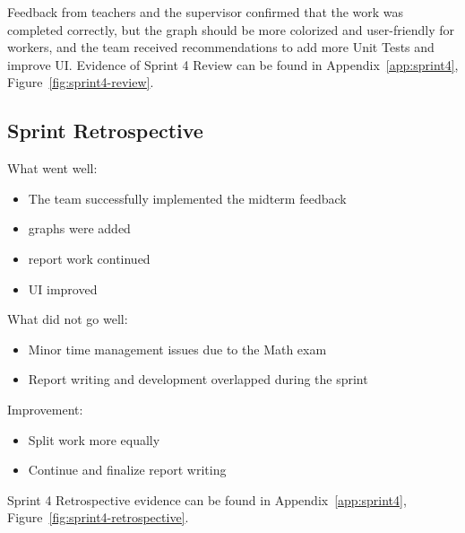 Feedback from teachers and the supervisor confirmed that the work was completed correctly, but the graph should be more colorized and user-friendly for workers, and the team received recommendations to add more Unit Tests and improve UI. Evidence of Sprint 4 Review can be found in Appendix~\ref{app:sprint4}, Figure~\ref{fig:sprint4-review}.

 

\subsection*{Sprint Retrospective}

What went well:

\begin{itemize}

    \item The team successfully implemented the midterm feedback

    \item graphs were added

    \item report work continued

    \item UI improved

\end{itemize}



What did not go well:

\begin{itemize}

    \item  Minor time management issues due to the Math exam

    \item  Report writing and development overlapped during the sprint

\end{itemize}



Improvement:

\begin{itemize}

    \item Split work more equally

    \item Continue and finalize report writing

\end{itemize}

Sprint 4 Retrospective evidence can be found in Appendix~\ref{app:sprint4}, Figure~\ref{fig:sprint4-retrospective}.
 

